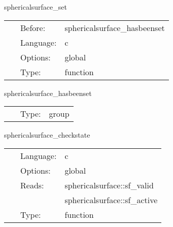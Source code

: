 \hspace{5mm} sphericalsurface\_set 

\hspace{5mm}{\it set surface radii } 


\hspace{5mm}

 \begin{tabular*}{160mm}{cll} 
~ & Before:  & sphericalsurface\_hasbeenset \\ 
~ & Language:  & c \\ 
~ & Options:  & global \\ 
~ & Type:  & function \\ 
\end{tabular*} 


\vspace{5mm}


\hspace{5mm} sphericalsurface\_hasbeenset 

\hspace{5mm}{\it set the spherical surfaces before this group, and use it afterwards } 


\hspace{5mm}

 \begin{tabular*}{160mm}{cll} 
~ & Type:  & group \\ 
\end{tabular*} 


\vspace{5mm}


\hspace{5mm} sphericalsurface\_checkstate 

\hspace{5mm}{\it test the state of the spherical surfaces } 


\hspace{5mm}

 \begin{tabular*}{160mm}{cll} 
~ & Language:  & c \\ 
~ & Options:  & global \\ 
~ & Reads:  & sphericalsurface::sf\_valid \\ 
~& ~ &sphericalsurface::sf\_active\\ 
~ & Type:  & function \\ 
\end{tabular*} 


